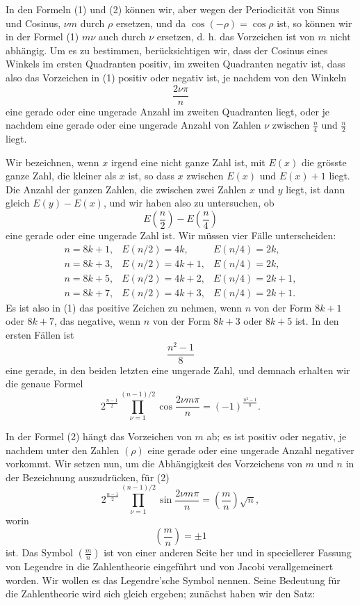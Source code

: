 \documentclass[11pt]{article}
\begin{document}
In den Formeln (1) und (2) können wir, aber wegen der Periodicität von Sinus und Cosinus, $\nu m$ durch $\rho$ ersetzen, und da $\cos(-\rho)=\cos\rho$ ist, so können wir in der Formel (1) $m\nu$ auch durch $\nu$ ersetzen, d. h. das Vorzeichen ist von $m$ nicht abhängig. Um es zu bestimmen, berücksichtigen wir, dass der Cosinus eines Winkels im ersten Quadranten positiv, im zweiten Quadranten negativ ist, dass also das Vorzeichen in (1) positiv oder negativ ist, je nachdem von den Winkeln
\[
        \frac{2\nu\pi}{n}
\]
eine gerade oder eine ungerade Anzahl im zweiten Quadranten liegt, oder je nachdem eine gerade oder eine ungerade Anzahl von Zahlen $\nu$ zwischen $\frac n4$ und $\frac n2$ liegt.

Wir bezeichnen, wenn $x$ irgend eine nicht ganze Zahl ist, mit $E(x)$ die grösste ganze Zahl, die kleiner als $x$ ist, so dass $x$ zwischen $E(x)$ und $E(x)+1$ liegt. Die Anzahl der ganzen Zahlen, die zwischen zwei Zahlen $x$ und $y$ liegt, ist dann gleich $E(y)-E(x)$, und wir haben also zu untersuchen, ob
\[
        E\left(\frac n2\right)-E\left(\frac n4\right)
\]
eine gerade oder eine ungerade Zahl ist. Wir müssen vier Fälle unterscheiden:
\[
\begin{array}{lll}
 n=8k+1, & E(n/2)=4k,   & E(n/4)=2k,\\
 n=8k+3, & E(n/2)=4k+1, & E(n/4)=2k,\\
 n=8k+5, & E(n/2)=4k+2, & E(n/4)=2k+1,\\
 n=8k+7, & E(n/2)=4k+3, & E(n/4)=2k+1.
\end{array}
\]
Es ist also in (1) das positive Zeichen zu nehmen, wenn $n$ von der Form $8k+1$ oder $8k+7$, das negative, wenn $n$ von der Form $8k+3$ oder $8k+5$ ist. In den ersten Fällen ist
\[
        \frac{n^2-1}{8}
\]
eine gerade, in den beiden letzten eine ungerade Zahl, und demnach erhalten wir die genaue Formel
\[
\tag{3}
2^{\frac{n-1}{2}}\prod_{\nu=1}^{(n-1)/2}
       \cos\frac{2\nu m\pi}{n}
   =(-1)^{\frac{n^2-1}{8}}.
\]

In der Formel (2) hängt das Vorzeichen von $m$ ab; es ist positiv oder negativ, je nachdem unter den Zahlen $(\rho)$ eine gerade oder eine ungerade Anzahl negativer vorkommt. Wir setzen nun, um die Abhängigkeit des Vorzeichens von $m$ und $n$ in der Bezeichnung auszudrücken, für (2)
\[
\tag{4}
2^{\frac{n-1}{2}}\prod_{\nu=1}^{(n-1)/2}
       \sin\frac{2\nu m\pi}{n}
   =\left(\frac mn\right)\sqrt n,
\]
worin
\[
        \left(\frac mn\right)=\pm1
\]
ist. Das Symbol $\left(\frac mn\right)$ ist von einer anderen Seite her und in speciellerer Fassung von Legendre in die Zahlentheorie eingeführt und von Jacobi verallgemeinert worden. Wir wollen es das Legendre'sche Symbol nennen. Seine Bedeutung für die Zahlentheorie wird sich gleich ergeben; zunächst haben wir den Satz:
\end{document}
